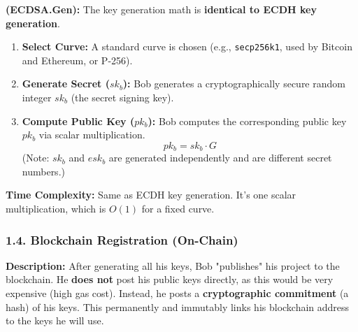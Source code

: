 \documentclass[12pt]{article}
\begin{document}
\textbf{ (ECDSA.Gen):}
The key generation math is \textbf{identical to ECDH key generation}.
\begin{enumerate}
    \item \textbf{Select Curve:} A standard curve is chosen (e.g., \texttt{secp256k1}, used by Bitcoin and Ethereum, or P-256).
    \item \textbf{Generate Secret ($sk_b$):} Bob generates a cryptographically secure random integer $sk_b$ (the secret signing key).
    \item \textbf{Compute Public Key ($pk_b$):} Bob computes the corresponding public key $pk_b$ via scalar multiplication.
    \[
    pk_b = sk_b \cdot G
    \]
    (Note: $sk_b$ and $esk_b$ are generated independently and are different secret numbers.)
\end{enumerate}

\textbf{Time Complexity:}
Same as ECDH key generation. It's one scalar multiplication, which is \textbf{$O(1)$} for a fixed curve.

\subsubsection*{1.4. Blockchain Registration (On-Chain)}

\textbf{Description:}
After generating all his keys, Bob "publishes" his project to the blockchain. He \textbf{does not} post his public keys directly, as this would be very expensive (high gas cost). Instead, he posts a \textbf{cryptographic commitment} (a hash) of his keys. This permanently and immutably links his blockchain address to the keys he will use.
\end{document}
